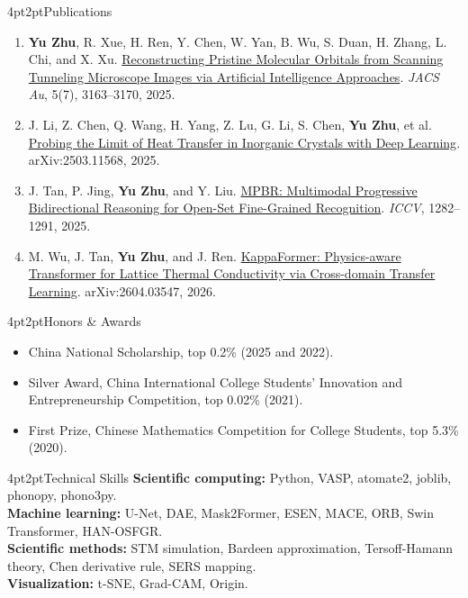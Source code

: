 \documentclass[10pt,a4paper]{article}
\makeatletter
\renewcommand\section{\@startsection{section}{1}{0pt}%
  {4pt}{2pt}{\large\bfseries\color{accent}}}
\makeatother
\begin{document}
\section{Publications}
\begin{enumerate}[leftmargin=1.5em,itemsep=3pt,topsep=2pt]
  \item \textbf{Yu Zhu}, R. Xue, H. Ren, Y. Chen, W. Yan, B. Wu, S. Duan,
  H. Zhang, L. Chi, and X. Xu.
  \href{https://doi.org/10.1021/jacsau.5c00310}{Reconstructing Pristine Molecular Orbitals from Scanning Tunneling Microscope Images via Artificial Intelligence Approaches}.
  \textit{JACS Au}, 5(7), 3163--3170, 2025.

  \item J. Li, Z. Chen, Q. Wang, H. Yang, Z. Lu, G. Li, S. Chen,
  \textbf{Yu Zhu}, et al.
  \href{https://doi.org/10.48550/arXiv.2503.11568}{Probing the Limit of Heat Transfer in Inorganic Crystals with Deep Learning}.
  arXiv:2503.11568, 2025.

  \item J. Tan, P. Jing, \textbf{Yu Zhu}, and Y. Liu.
  \href{https://openaccess.thecvf.com/content/ICCV2025/html/Tan_MPBR_Multimodal_Progressive_Bidirectional_Reasoning_for_Open-Set_Fine-Grained_Recognition_ICCV_2025_paper.html}{MPBR: Multimodal Progressive Bidirectional Reasoning for Open-Set Fine-Grained Recognition}.
  \textit{ICCV}, 1282--1291, 2025.

  \item M. Wu, J. Tan, \textbf{Yu Zhu}, and J. Ren.
  \href{https://doi.org/10.48550/arXiv.2604.03547}{KappaFormer: Physics-aware Transformer for Lattice Thermal Conductivity via Cross-domain Transfer Learning}.
  arXiv:2604.03547, 2026.
\end{enumerate}

\section{Honors \& Awards}
\begin{itemize}
  \item China National Scholarship, top 0.2\% (2025 and 2022).
  \item Silver Award, China International College Students' Innovation and Entrepreneurship Competition, top 0.02\% (2021).
  \item First Prize, Chinese Mathematics Competition for College Students, top 5.3\% (2020).
\end{itemize}

\section{Technical Skills}
\textbf{Scientific computing:} Python, VASP, atomate2, joblib, phonopy, phono3py.\\
\textbf{Machine learning:} U-Net, DAE, Mask2Former, ESEN, MACE, ORB, Swin Transformer, HAN-OSFGR.\\
\textbf{Scientific methods:} STM simulation, Bardeen approximation, Tersoff-Hamann theory, Chen derivative rule, SERS mapping.\\
\textbf{Visualization:} t-SNE, Grad-CAM, Origin.
\end{document}
